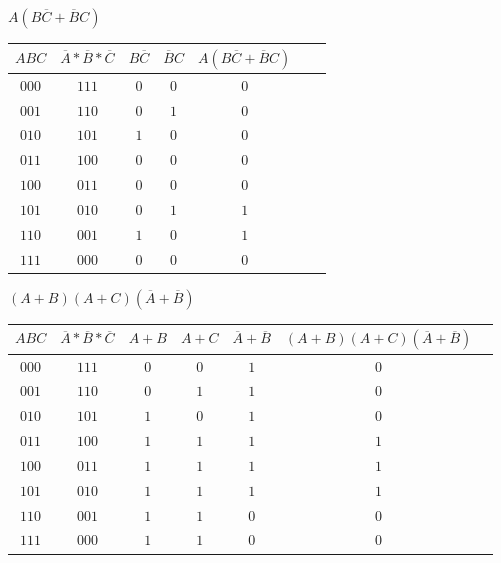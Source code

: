 \documentclass[12pt,largemargins]{homework}
\begin{document}
\begin{alphaparts}
\begin{tabular}{|c|c|c|c|c|c|c|c|}
\end{tabular}
\newpage
\item
$A(B\overline{C} + \overline{B}C)$ \\

\begin{tabular}{|c|c|c|c|c|c|c|}
\hline
$ABC$ & $\overline{A}*\overline{B}*\overline{C}$ & $B\overline{C}$ & $\overline{B}C$ & $A(B\overline{C} + \overline{B}C)$ \\
\hline
$000$ & $111$ & $ 0 $ & $ 0$ & $ 0$ \\
$001$ & $110$ & $ 0 $ & $ 1$ & $ 0$ \\
$010$ & $101$ & $ 1 $ & $ 0$ & $ 0$ \\
$011$ & $100$ & $ 0 $ & $ 0$ & $ 0$ \\
$100$ & $011$ & $ 0 $ & $ 0$ & $ 0$ \\
$101$ & $010$ & $ 0 $ & $ 1$ & $ 1$ \\
$110$ & $001$ & $ 1 $ & $ 0$ & $ 1$ \\
$111$ & $000$ & $ 0 $ & $ 0$ & $ 0$ \\
\hline

\end{tabular}
\item
$(A+B)(A+C)(\overline{A}+\overline{B})$\\

\begin{tabular}{|c|c|c|c|c|c|c|}
\hline
$ABC$ & $\overline{A}*\overline{B}*\overline{C}$& $A + B$ & $A+C$ & $\overline{A}+\overline{B}$ & $(A+B)(A+C)(\overline{A}+\overline{B})$\\
\hline
$000$ & $111$ & $ 0 $ & $ 0$ & $ 1$ & $ 0$ \\
$001$ & $110$ & $ 0 $ & $ 1$ & $ 1$ & $ 0$ \\
$010$ & $101$ & $ 1 $ & $ 0$ & $ 1$ & $ 0$ \\
$011$ & $100$ & $ 1 $ & $ 1$ & $ 1$ & $ 1$ \\
$100$ & $011$ & $ 1 $ & $ 1$ & $ 1$ & $ 1$ \\
$101$ & $010$ & $ 1 $ & $ 1$ & $ 1$ & $ 1$ \\
$110$ & $001$ & $ 1 $ & $ 1$ & $ 0$ & $ 0$ \\
$111$ & $000$ & $ 1 $ & $ 1$ & $ 0$ & $ 0$ \\
\hline

\end{tabular}
\end{alphaparts}
\end{document}
